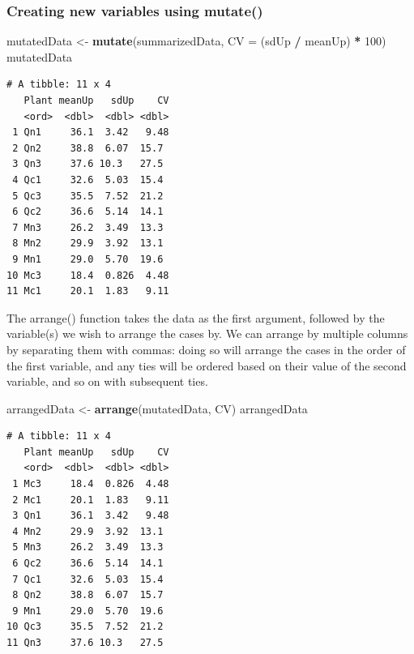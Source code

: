 \documentclass[
]{article}
\newenvironment{Shaded}{\begin{snugshade}}{\end{snugshade}}
\newcommand{\AttributeTok}[1]{\textcolor[rgb]{0.13,0.29,0.53}{#1}}
\newcommand{\DecValTok}[1]{\textcolor[rgb]{0.00,0.00,0.81}{#1}}
\newcommand{\FunctionTok}[1]{\textcolor[rgb]{0.13,0.29,0.53}{\textbf{#1}}}
\newcommand{\NormalTok}[1]{#1}
\newcommand{\OtherTok}[1]{\textcolor[rgb]{0.56,0.35,0.01}{#1}}
\newcommand{\SpecialCharTok}[1]{\textcolor[rgb]{0.81,0.36,0.00}{\textbf{#1}}}
\begin{document}
\subsubsection{Creating new variables using
mutate()}\label{creating-new-variables-using-mutate}

\begin{Shaded}
\begin{Highlighting}[]
\NormalTok{mutatedData }\OtherTok{\textless{}{-}} \FunctionTok{mutate}\NormalTok{(summarizedData, }\AttributeTok{CV =}\NormalTok{ (sdUp }\SpecialCharTok{/}\NormalTok{ meanUp) }\SpecialCharTok{*} \DecValTok{100}\NormalTok{)}
\NormalTok{mutatedData}
\end{Highlighting}
\end{Shaded}

\begin{verbatim}
# A tibble: 11 x 4
   Plant meanUp   sdUp    CV
   <ord>  <dbl>  <dbl> <dbl>
 1 Qn1     36.1  3.42   9.48
 2 Qn2     38.8  6.07  15.7 
 3 Qn3     37.6 10.3   27.5 
 4 Qc1     32.6  5.03  15.4 
 5 Qc3     35.5  7.52  21.2 
 6 Qc2     36.6  5.14  14.1 
 7 Mn3     26.2  3.49  13.3 
 8 Mn2     29.9  3.92  13.1 
 9 Mn1     29.0  5.70  19.6 
10 Mc3     18.4  0.826  4.48
11 Mc1     20.1  1.83   9.11
\end{verbatim}

The arrange() function takes the data as the first argument, followed by
the variable(s) we wish to arrange the cases by. We can arrange by
multiple columns by separating them with commas: doing so will arrange
the cases in the order of the first variable, and any ties will be
ordered based on their value of the second variable, and so on with
subsequent ties.

\begin{Shaded}
\begin{Highlighting}[]
\NormalTok{arrangedData }\OtherTok{\textless{}{-}} \FunctionTok{arrange}\NormalTok{(mutatedData, CV)}
\NormalTok{arrangedData}
\end{Highlighting}
\end{Shaded}

\begin{verbatim}
# A tibble: 11 x 4
   Plant meanUp   sdUp    CV
   <ord>  <dbl>  <dbl> <dbl>
 1 Mc3     18.4  0.826  4.48
 2 Mc1     20.1  1.83   9.11
 3 Qn1     36.1  3.42   9.48
 4 Mn2     29.9  3.92  13.1 
 5 Mn3     26.2  3.49  13.3 
 6 Qc2     36.6  5.14  14.1 
 7 Qc1     32.6  5.03  15.4 
 8 Qn2     38.8  6.07  15.7 
 9 Mn1     29.0  5.70  19.6 
10 Qc3     35.5  7.52  21.2 
11 Qn3     37.6 10.3   27.5 
\end{verbatim}
\end{document}
